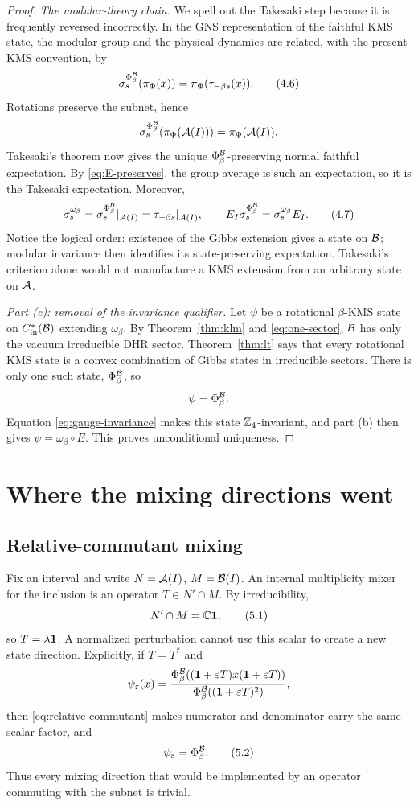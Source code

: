 \begin{proof}
\emph{The modular-theory chain.}
We spell out the Takesaki step because it is frequently reversed
incorrectly.  In the GNS representation of the faithful KMS state,
the modular group and the physical dynamics are related, with the
present KMS convention, by
\[
 \sigma_s^{\Phi_\beta^{\mathcal B}}(\pi_\Phi(x))
 =\pi_\Phi(\tau_{-\beta s}(x)).
\tag{4.6}\label{eq:kms-modular}
\]
Rotations preserve the subnet, hence
\[
 \sigma_s^{\Phi_\beta^{\mathcal B}}
   (\pi_\Phi(\mathcal A(I)))=\pi_\Phi(\mathcal A(I)).
\]
Takesaki's theorem now gives the unique
$\Phi_\beta^{\mathcal B}$-preserving normal faithful expectation.  By
\eqref{eq:E-preserves}, the group average is such an expectation, so
it is the Takesaki expectation.  Moreover,
\[
 \sigma_s^{\omega_\beta}
 =\sigma_s^{\Phi_\beta^{\mathcal B}}|_{\mathcal A(I)}
 =\tau_{-\beta s}|_{\mathcal A(I)},\qquad
 E_I\sigma_s^{\Phi_\beta^{\mathcal B}}
 =\sigma_s^{\omega_\beta}E_I.
\tag{4.7}\label{eq:modular-chain}
\]
Notice the logical order: existence of the Gibbs extension gives a
state on $\mathcal B$; modular invariance then identifies its
state-preserving expectation.  Takesaki's criterion alone would not
manufacture a KMS extension from an arbitrary state on $\mathcal A$.

\emph{Part (c): removal of the invariance qualifier.}
Let $\psi$ be a rotational $\beta$-KMS state on
$C^*_{\mathrm{ln}}(\mathcal B)$ extending $\omega_\beta$.  By
Theorem~\ref{thm:klm} and \eqref{eq:one-sector}, $\mathcal B$ has only the
vacuum irreducible DHR sector.  Theorem~\ref{thm:lt} says that every
rotational KMS state is a convex combination of Gibbs states in
irreducible sectors.  There is only one such state,
$\Phi_\beta^{\mathcal B}$, so
\[
 \psi=\Phi_\beta^{\mathcal B}.
\]
Equation \eqref{eq:gauge-invariance} makes this state
$\mathbb Z_4$-invariant, and part (b) then gives
$\psi=\omega_\beta\circ E$.  This proves unconditional uniqueness.
\end{proof}

\section{Where the mixing directions went}

\subsection{Relative-commutant mixing}

Fix an interval and write $N=\mathcal A(I)$, $M=\mathcal B(I)$.  An internal
multiplicity mixer for the inclusion is an operator $T\in N'\cap M$.
By irreducibility,
\[
 N'\cap M=\mathbb C\mathbf 1,
\tag{5.1}\label{eq:relative-commutant}
\]
so $T=\lambda\mathbf 1$.  A normalized perturbation cannot use this scalar
to create a new state direction.  Explicitly, if
$T=T^*$ and
\[
 \psi_\varepsilon(x)
 =\frac{\Phi_\beta^{\mathcal B}
 ((\mathbf 1+\varepsilon T)x(\mathbf 1+\varepsilon T))}
 {\Phi_\beta^{\mathcal B}((\mathbf 1+\varepsilon T)^2)},
\]
then \eqref{eq:relative-commutant} makes numerator and denominator
carry the same scalar factor, and
\[
 \psi_\varepsilon=\Phi_\beta^{\mathcal B}.
\tag{5.2}\label{eq:scalar-pert}
\]
Thus every mixing direction that would be implemented by an
operator commuting with the subnet is trivial.

